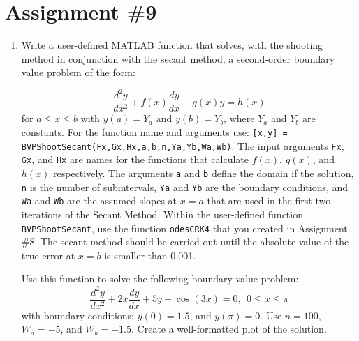\chapter{Assignment \#9}

\label{ch:ass9n}

\begin{fullwidth}

\begin{enumerate}
\item Write a user-defined MATLAB function that solves, with the shooting method in conjunction with the secant method, a second-order boundary value problem of the form:

\begin{equation*}
\frac{d^2y}{dx^2}+f(x)\frac{dy}{dx} + g(x)y = h(x)
\end{equation*}
for $a \le x \le b$ with $y(a)=Y_a$ and $y(b)=Y_b$, where $Y_a$ and $Y_b$ are constants.  For the function name and arguments use: \lstinline[style=myMatlab]{[x,y] = BVPShootSecant(Fx,Gx,Hx,a,b,n,Ya,Yb,Wa,Wb)}.  The input arguments \lstinline[style=myMatlab]{Fx}, \lstinline[style=myMatlab]{Gx}, and \lstinline[style=myMatlab]{Hx} are names for the functions that calculate $f(x)$, $g(x)$, and $h(x)$ respectively.  The arguments \lstinline[style=myMatlab]{a} and \lstinline[style=myMatlab]{b} define the domain if the solution, \lstinline[style=myMatlab]{n} is the number of subintervals, \lstinline[style=myMatlab]{Ya} and \lstinline[style=myMatlab]{Yb} are the boundary conditions, and \lstinline[style=myMatlab]{Wa} and \lstinline[style=myMatlab]{Wb} are the assumed slopes at $x=a$ that are used in the first two iterations of the Secant Method.  Within the user-defined function \lstinline[style=myMatlab]{BVPShootSecant}, use the function \lstinline[style=myMatlab]{odesCRK4} that you created in Assignment \#8.  The secant method should be carried out until the absolute value of the true error at $x=b$ is smaller than 0.001.

\vspace{0.5cm}

\noindent Use this function to solve the following boundary value problem:
\begin{equation*}
\frac{d^2y}{dx^2}+2x\frac{dy}{dx}+5y-\cos{(3x)}=0, \ \ 0 \le x \le \pi
\end{equation*}
with boundary conditions: $y(0)=1.5$, and $y(\pi)=0$.  Use $n=100$, $W_a=-5$, and $W_b = -1.5$.  Create a well-formatted plot of the solution.


\pagebreak


\end{enumerate}
\end{fullwidth}
